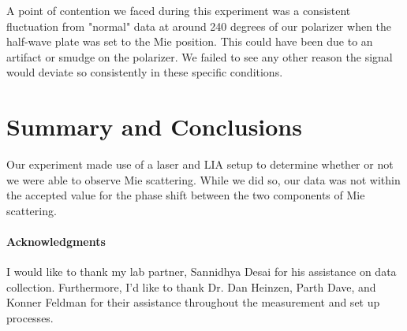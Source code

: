 \documentclass[10pt,letterpaper,onecolumn]{article}
\begin{document}
A point of contention we faced during this experiment was a consistent fluctuation from "normal" data at around 240 degrees of our polarizer when the half-wave plate was set to the Mie position. This could have been due to an artifact or smudge on the polarizer. We failed to see any other reason the signal would deviate so consistently in these specific conditions.
\section{Summary and Conclusions}
Our experiment made use of a laser and LIA setup to determine whether or not we were able to observe Mie scattering. While we did so, our data was not within the accepted value for the phase shift between the two components of Mie scattering.
\paragraph*{Acknowledgments}
I would like to thank my lab partner, Sannidhya Desai for his assistance on data
collection. Furthermore, I'd like to thank Dr. Dan Heinzen,
Parth Dave, and Konner Feldman for their assistance throughout the measurement and 
set up processes.




    
\end{document}
